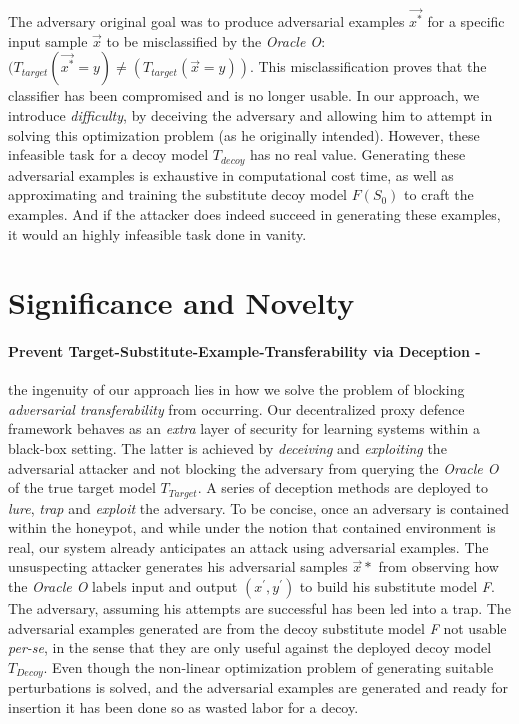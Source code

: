 \documentclass[grad,lot,lof,11pt,oneside,onehalfspace]{RUthesis}
\begin{document}
The adversary original goal was to produce adversarial examples \textit{$\vec{x^{*}}$} for a specific input sample $\vec{x}$ to be misclassified by the \textit{Oracle O}: \textit{$(T_{target}(\textit{$\vec{x^{*}}$}=y) \neq (T_{target}(\textit{$\vec{x}$}=y))$}. This misclassification proves that the classifier has been compromised and is no longer usable. In our approach, we introduce \textit{difficulty}, by deceiving the adversary and allowing him to attempt in solving this optimization problem (as he originally intended). However, these infeasible task for a decoy model \textit{$T_{decoy}$} has no real value. Generating these adversarial examples is exhaustive in computational cost time, as well as approximating and training the substitute decoy model \textit{$F(S_{0})$} to craft the examples. And if the attacker does indeed succeed in generating these examples, it would an highly infeasible task done in vanity.
\section{Significance and Novelty}
\paragraph{Prevent    Target-Substitute-Example-Transferability via Deception -} the ingenuity of our approach lies in how we solve the problem of blocking \textit{adversarial transferability} from occurring. Our decentralized proxy defence framework behaves as an \textit{extra} layer of security for learning systems within a black-box setting. The latter is achieved by \textit{deceiving} and \textit{exploiting} the adversarial attacker and not blocking the adversary from querying the \textit{Oracle O} of the true target model \textit{$T_{Target}$}. A series of deception methods are deployed to \textit{lure}, \textit{trap} and \textit{exploit} the adversary. To be concise, once an adversary is contained within the honeypot, and while under the notion that contained environment is real, our system already anticipates an attack using adversarial examples. The unsuspecting attacker generates his adversarial samples $\vec{x}*$ from observing how the \textit{Oracle O} labels input and output \textit{$(x^{'},y^{'})$} to build his substitute model \textit{F}. The adversary, assuming his attempts are successful has been led into a trap. The adversarial examples generated are from the decoy substitute model \textit{F} not usable \textit{per-se}, in the sense that they are only useful against the deployed decoy model \textit{$T_{Decoy}$}. Even though the non-linear optimization problem of generating suitable perturbations is solved, and the adversarial examples are generated and ready for insertion it has been done so as wasted labor for a decoy. 
\end{document}

